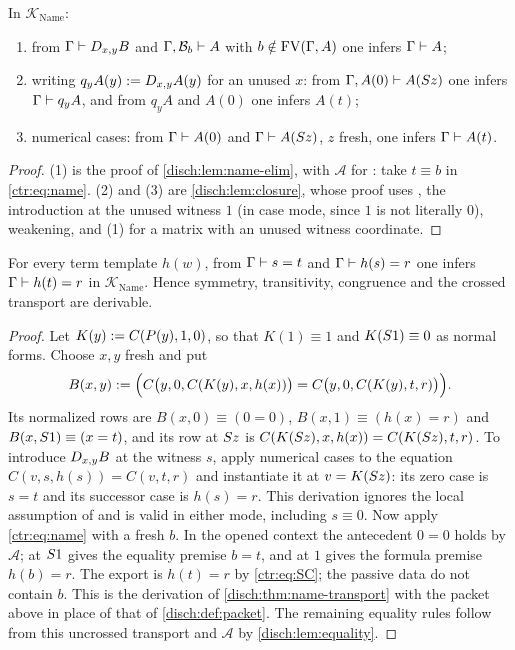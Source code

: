 \begin{lemma}\label{ctr:lem:nameelim}
In $\mathcal K_{\mathrm{Name}}$:
\begin{enumerate}
\item from $\Gamma\vdash D_{x,y}B$ and $\Gamma,\mathcal B_b\vdash A$ with
$b\notin\operatorname{FV}(\Gamma,A)$ one infers $\Gamma\vdash A$;
\item writing $q_yA(y)\mathrel{:=}D_{x,y}A(y)$ for an unused $x$: from
$\Gamma,A(0)\vdash A(S z)$ one infers $\Gamma\vdash q_yA$, and from $q_yA$ and $A(0)$
one infers $A(t)$;
\item numerical cases: from $\Gamma\vdash A(0)$ and $\Gamma\vdash A(S z)$, $z$ fresh,
one infers $\Gamma\vdash A(t)$.
\end{enumerate}
\end{lemma}
\begin{proof}
(1) is the proof of \cref{disch:lem:name-elim}, with $\mathcal A$ for : take
$t\equiv b$ in \eqref{ctr:eq:name}. (2) and (3) are \cref{disch:lem:closure}, whose proof
uses , the introduction at the unused witness $1$ (in case mode, since $1$ is
not literally $0$), weakening, and (1) for a matrix with an unused witness coordinate.
\end{proof}

\begin{lemma}\label{ctr:lem:nametransport}
For every term template $h(w)$, from $\Gamma\vdash s=t$ and $\Gamma\vdash h(s)=r$ one
infers $\Gamma\vdash h(t)=r$ in $\mathcal K_{\mathrm{Name}}$. Hence symmetry,
transitivity, congruence and the crossed transport  are derivable.
\end{lemma}
\begin{proof}
Let $K(y)\mathrel{:=} C(P(y),1,0)$, so that $K(1)\equiv 1$ and $K(S 1)\equiv 0$ as normal
forms. Choose $x,y$ fresh and put
\[
 B(x,y)\mathrel{:=}\Bigl(C\bigl(y,0,C(K(y),x,h(x))\bigr)=C\bigl(y,0,C(K(y),t,r)\bigr)\Bigr).
\]
Its normalized rows are $B(x,0)\equiv(0=0)$, $B(x,1)\equiv(h(x)=r)$ and
$B(x,S 1)\equiv(x=t)$, and its row at $S z$ is
$C(K(S z),x,h(x))=C(K(S z),t,r)$. To introduce $D_{x,y}B$ at the witness $s$, apply
numerical cases to the equation $C(v,s,h(s))=C(v,t,r)$ and instantiate it at
$v=K(S z)$: its zero case is $s=t$ and its successor case is $h(s)=r$. This derivation
ignores the local assumption of  and is valid in either mode, including
$s\equiv 0$. Now apply \eqref{ctr:eq:name} with a fresh $b$. In the opened context the
antecedent $0=0$ holds by $\mathcal A$;  at $S 1$ gives the equality
premise $b=t$, and  at $1$ gives the formula premise $h(b)=r$. The export is
$h(t)=r$ by \eqref{ctr:eq:SC}; the passive data do not contain $b$. This is the derivation
of \cref{disch:thm:name-transport} with the packet above in place of that of
\cref{disch:def:packet}. The remaining equality rules follow from this uncrossed transport
and $\mathcal A$ by \cref{disch:lem:equality}.
\end{proof}

